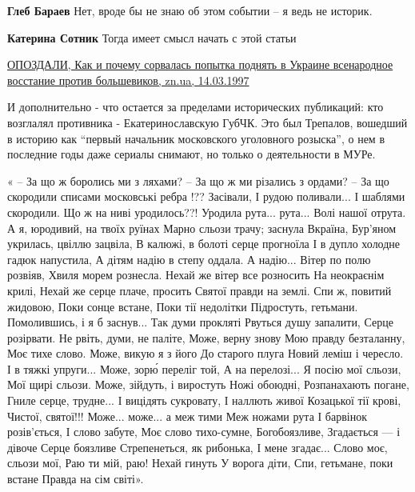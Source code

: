 \begin{itemize}
\begin{itemize}
\textbf{Глеб Бараев}
Нет, вроде бы не знаю об этом событии – я ведь не историк.

\textbf{Катерина Сотник} Тогда имеет смысл начать с этой статьи 

\href{https://zn.ua/SOCIETY/opozdali.html}{%
ОПОЗДАЛИ, Как и почему сорвалась попытка поднять в Украине всенародное восстание против большевиков, %
zn.ua, 14.03.1997%
}


И дополнительно - что остается за пределами исторических публикаций: кто
возглалял противника - Екатеринославскую ГубЧК. Это был Трепалов, вошедший в
историю как \enquote{первый начальник московского уголовного розыска}, о нем в
последние годы даже сериалы снимают, но только о деятельности в МУРе.

\end{itemize} %


\begin{multicols}{3} %
\obeycr
« – За що ж боролись ми з ляхами?
– За що ж ми різались з ордами?
– За що скородили списами
московські ребра !??
\smallskip
Засівали,
І рудою поливали...
І шаблями скородили.
Що ж на ниві уродилось??!
\smallskip
Уродила рута... рута...
Волі нашої отрута.
А я, юродивий, на твоїх руїнах
Марно сльози трачу; заснула Вкраїна,
\smallskip
Бур’яном укрилась, цвіллю зацвіла,
В калюжі, в болоті серце прогноїла
І в дупло холодне гадюк напустила,
А дітям надію в степу оддала.
\smallskip
А надію...
Вітер по полю розвіяв,
Хвиля морем рознесла.
Нехай же вітер все розносить
На неокраєнім крилі,
Нехай же серце плаче, просить
Святої правди на землі.
\smallskip
Спи ж, повитий жидовою,
Поки сонце встане,
Поки тії недолітки
Підростуть, гетьмани.
Помолившись, і я б заснув...
\smallskip
Так думи прокляті
Рвуться душу запалити,
Серце розірвати.
Не рвіть, думи, не паліте,
Може, верну знову
Мою правду безталанну,
Моє тихе слово.
\smallskip
Може, викую я з його
До старого плуга
Новий леміш і чересло.
І в тяжкі упруги...
Може, зорю́ переліг той,
А на перелозі...
\smallskip
Я посію мої сльози,
Мої щирі сльози.
Може, зійдуть, і виростуть
Ножі обоюдні,
Розпанахають погане,
Гниле серце, трудне...
\smallskip
І вицідять сукровату,
І наллють живої
Козацької тії крові,
Чистої, святої!!!
\smallskip
Може... може... а меж тими
Меж ножами рута
І барвінок розів’ється,
І слово забуте,
Моє слово тихо-сумне,
\smallskip
Богобоязливе,
Згадається — і дівоче
Серце боязливе
Стрепенеться, як рибонька,
І мене згадає...
Слово моє, сльози мої,
\smallskip
Раю ти мій, раю!
Нехай гинуть
У ворога діти,
Спи, гетьмане, поки встане
Правда на сім світі».
\restorecr
\end{multicols} %


\end{itemize}
